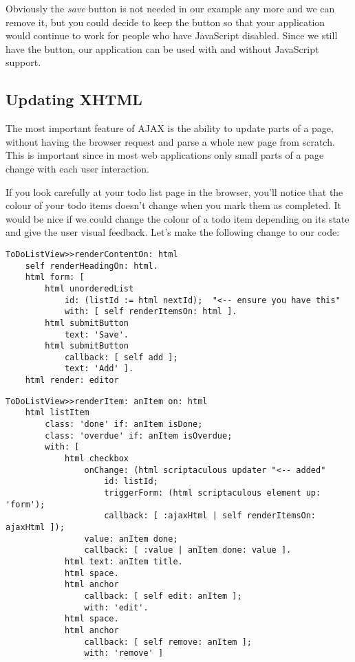 \documentclass[a4paper,10pt,twoside]{book}
\begin{document}
Obviously the \textit{save} button is not needed in our example any more and we can remove it, but you could decide to keep the button so that your application would continue to work for people who have JavaScript disabled. Since we still have the button, our application can be used with and without JavaScript support.

\subsection{Updating XHTML}
\label{book:web20:scriptaculous:ajax:updating}

The most important feature of AJAX is the ability to update parts of a page, without having the browser request and parse a whole new page from scratch. This is important since in most web applications only small parts of a page change with each user interaction.

If you look carefully at your todo list page in the browser, you'll notice that the colour of your todo items doesn't change when you mark them as completed. It would be nice if we could change the colour of a todo item depending on its state and give the user visual feedback. Let's make the following change to our code:

\begin{lstlisting}
ToDoListView>>renderContentOn: html
    self renderHeadingOn: html.
    html form: [
        html unorderedList
            id: (listId := html nextId);  "<-- ensure you have this"
            with: [ self renderItemsOn: html ].
        html submitButton
            text: 'Save'.
        html submitButton
            callback: [ self add ];
            text: 'Add' ].
    html render: editor
\end{lstlisting}

\begin{lstlisting}
ToDoListView>>renderItem: anItem on: html
    html listItem
        class: 'done' if: anItem isDone;
        class: 'overdue' if: anItem isOverdue;
        with: [
            html checkbox
                onChange: (html scriptaculous updater "<-- added"
                    id: listId;
                    triggerForm: (html scriptaculous element up: 'form');
                    callback: [ :ajaxHtml | self renderItemsOn: ajaxHtml ]);
                value: anItem done;
                callback: [ :value | anItem done: value ].
            html text: anItem title.
            html space.
            html anchor
                callback: [ self edit: anItem ];
                with: 'edit'.
            html space.
            html anchor
                callback: [ self remove: anItem ];
                with: 'remove' ]
\end{lstlisting}
\end{document}

